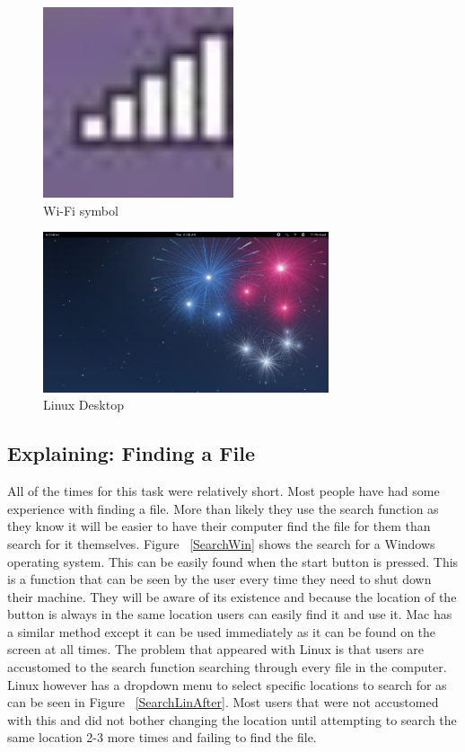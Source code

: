 \documentclass[11pt]{article}
\begin{document}
\begin{figure}[h!]
  \centering
    \includegraphics[width=0.5\textwidth]{./Images/Symbol_Wi-Fi}
  \caption{Wi-Fi symbol}
 \label{WF}
\end{figure}

\begin{figure}[h!]
  \centering
    \includegraphics[width=0.75\textwidth]{./Images/Linux_Main}
  \caption{Linux Desktop}
 \label{LinDesktop}
\end{figure}

\subsection{Explaining: Finding a File}
All of the times for this task were relatively short. Most people have had some experience with finding a file. More than likely they use the search function as they know it will be easier to have their computer find the file for them than search for it themselves. Figure ~\ref{SearchWin} shows the search for a Windows operating system. This can be easily found when the start button is pressed. This is a function that can be seen by the user every time they need to shut down their machine. They will be aware of its existence and because the location of the button is always in the same location users can easily find it and use it. Mac has a similar method except it can be used immediately as it can be found on the screen at all times. The problem that appeared with Linux is that users are accustomed to the search function searching through every file in the computer. Linux however has a dropdown menu to select specific locations to search for as can be seen in Figure ~\ref{SearchLinAfter}. Most users that were not accustomed with this and did not bother changing the location until attempting to search the same location 2-3 more times and failing to find the file.
\end{document}
